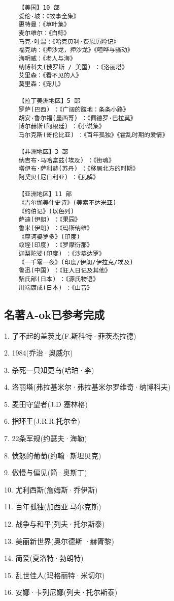\documentclass[UTF8]{../../RepresentationUniverse}
\begin{document}
\begin{lstlisting}
    【美国】10 部 
    爱伦·坡：《故事全集》
    惠特曼：《草叶集》
    麦尔维尔：《白鲸》
    马克·吐温：《哈克贝利·费恩历险记》
    福克纳：《押沙龙，押沙龙》《喧哗与骚动》
    海明威：《老人与海》
    纳博科夫(俄罗斯 / 美国) ：《洛丽塔》
    艾里森：《看不见的人》
    莫里森：《宠儿》
    
    【拉丁美洲地区】5 部 
    罗萨(巴西) ：《广阔的腹地：条条小路》
    胡安·鲁尔福(墨西哥) ：《佩德罗·巴拉莫》
    博尔赫斯(阿根廷) ：《小说集》
    马尔克斯(哥伦比亚) ：《百年孤独》《霍乱时期的爱情》
    
    【非洲地区】3 部 
    纳吉布·马哈富兹(埃及) ：《街魂》
    塔伊布·萨利赫(苏丹) ：《移居北方的时期》
    阿契贝(尼日利亚) ：《瓦解》
    
    【亚洲地区】11 部 
    《吉尔伽美什史诗》(美索不达米亚) 
    《约伯记》(以色列) 
    萨迪(伊朗) ：《果园》
    鲁米(伊朗) ：《玛斯纳维》
    《摩诃婆罗多》(印度) 
    蚁垤(印度) ：《罗摩衍那》
    迦梨陀娑(印度) ：《沙恭达罗》
    《一千零一夜》(印度/伊朗/伊拉克/埃及) 
    鲁迅(中国) ：《狂人日记及其他》
    紫氏部(日本) ：《源氏物语》
    川端康成(日本) ：《山音》
\end{lstlisting}



\subsection{名著A-ok已参考完成}

1. 了不起的盖茨比(F.斯科特·菲茨杰拉德) 

2. 1984(乔治·奥威尔) 

3. 杀死一只知更鸟(哈珀·李) 

4. 洛丽塔(弗拉基米尔·弗拉基米尔罗维奇·纳博科夫) 

5. 麦田守望者(J.D 塞林格) 

6. 指环王(J.R.R.托尔金) 

7. 22条军规(约瑟夫·海勒) 

8. 愤怒的葡萄(约翰·斯坦贝克) 

9. 傲慢与偏见(简·奥斯丁) 

10. 尤利西斯(詹姆斯·乔伊斯) 

11. 百年孤独(加西亚.马尔克斯) 

12. 战争与和平(列夫·托尔斯泰) 

13. 美丽新世界(奥尔德斯 ·赫胥黎) 

14. 简爱(夏洛特·勃朗特) 

15. 乱世佳人(玛格丽特·米切尔) 

16. 安娜·卡列尼娜(列夫·托尔斯泰) 
\end{document}
